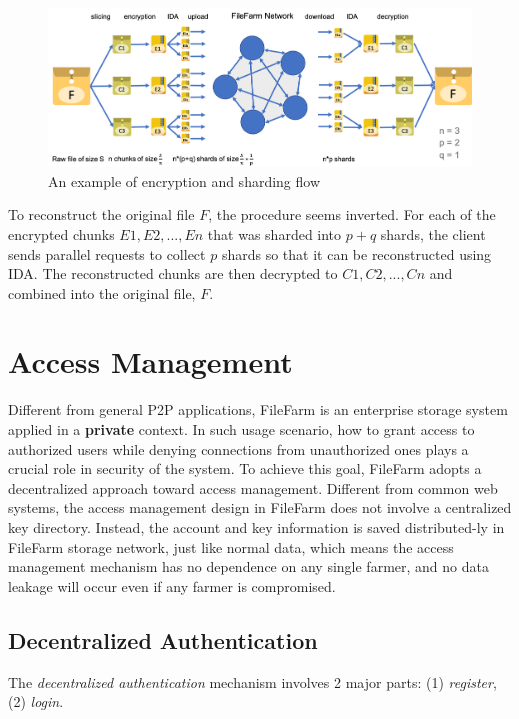 \begin{figure}[!b]
  \centering
    \includegraphics[width=15cm]{figures/data_confidentiality.png}
    \caption{An example of encryption and sharding flow}
    \label{fig:dataconfidentiality}
\end{figure}

To reconstruct the original file $F$, the procedure seems inverted. For each of the encrypted chunks $E1, E2, ..., En$ that was sharded into $p+q$ shards, the client sends parallel requests to collect $p$ shards so that it can be reconstructed using IDA. The reconstructed chunks are then decrypted to $C1, C2, ..., Cn$ and combined into the original file, $F$.

\section{Access Management}
\label{s:accessmanagement}

Different from general P2P applications, FileFarm is an enterprise storage system applied in a \textbf{private} context. In such usage scenario, how to grant access to authorized users while denying connections from unauthorized ones plays a crucial role in security of the system. To achieve this goal, FileFarm adopts a decentralized approach toward access management. Different from common web systems, the access management design in FileFarm does not involve a centralized key directory. Instead, the account and key information is saved distributed-ly in FileFarm storage network, just like normal data, which means the access management mechanism has no dependence on any single farmer, and no data leakage will occur even if any farmer is compromised.

\subsection{Decentralized Authentication}
\label{ss:decentralizedauthentication}

The \textit{decentralized authentication} mechanism involves 2 major parts: (1) \textit{register}, (2) \textit{login}.


